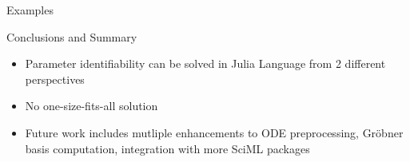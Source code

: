 \documentclass[12pt, aspectratio=169]{beamer}
\begin{document}
\begin{frame}{Examples}

\end{frame}
\begin{frame}{Conclusions and Summary}
    \begin{itemize}
        \item Parameter identifiability can be solved in Julia Language from 2 different perspectives
        \item No one-size-fits-all solution
        \item Future work includes mutliple enhancements to ODE preprocessing, Gr\"obner basis computation, integration with more SciML packages
    \end{itemize}
\end{frame}
\printbibliography{}
\end{document}
